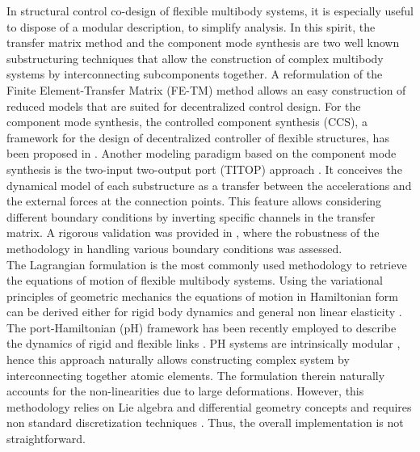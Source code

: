 In structural control co-design of flexible multibody systems, it is especially useful to dispose of a modular description, to simplify analysis. In this spirit, the transfer matrix method \cite{rong2010transfer} and the component mode synthesis \cite{hurty1965cms} are two well known substructuring techniques that allow the construction of complex multibody systems by interconnecting subcomponents together. A reformulation of the Finite Element-Transfer Matrix (FE-TM) method \cite{tan1990transfer} allows an easy construction of reduced models that are suited for decentralized control design. For the component mode synthesis, the controlled component synthesis (CCS), a framework for the design of decentralized controller of flexible structures, has been proposed in \cite{young1990}. Another modeling paradigm based on the component mode synthesis is the two-input two-output port (TITOP) approach \cite{alazard2015titop}. It conceives the dynamical model of each substructure as a transfer between the accelerations and the external forces at the connection points. This feature allows considering different boundary conditions by inverting specific channels in the transfer matrix. A rigorous validation was provided in \cite{perez2016flexible,sanfedino2018finite}, where the robustness of the methodology in handling various boundary conditions was assessed. \\
\indent The Lagrangian formulation is the most commonly used methodology to retrieve the equations of motion of flexible multibody systems. {Using the variational principles of geometric mechanics the equations of motion in Hamiltonian form can be derived either for rigid body dynamics \cite[Proposition 7.1.1]{holm2008geometric} and general non linear elasticity \cite[Chapter 3]{marsden1981lectures}.} The port-Hamiltonian (pH) framework \cite{duindam2009} has been recently employed to describe the dynamics of rigid and flexible links \cite{macchelli2007link,macchelli2009multi}. PH systems are intrinsically modular \cite{cervera2007interconnection}, hence this approach naturally allows constructing complex system by interconnecting together atomic elements. The formulation therein naturally accounts for the non-linearities due to large deformations.  However, this methodology relies on Lie algebra and differential geometry concepts and requires non standard discretization techniques \cite{golo2004hamiltonian}. Thus, the overall implementation is not straightforward. \\
